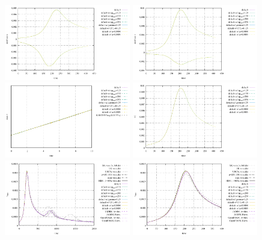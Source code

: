 \begin{center}
\includegraphics[width=5.5cm]{python_codes/fieldstone_95/results/u}
\includegraphics[width=5.5cm]{python_codes/fieldstone_95/results/v}\\
\includegraphics[width=5.5cm]{python_codes/fieldstone_95/results/v_start}
\includegraphics[width=5.5cm]{python_codes/fieldstone_95/results/vel}\\
\includegraphics[width=5.5cm]{python_codes/fieldstone_95/results/vrms2000}
\includegraphics[width=5.5cm]{python_codes/fieldstone_95/results/vrms400}\\

\end{center}
